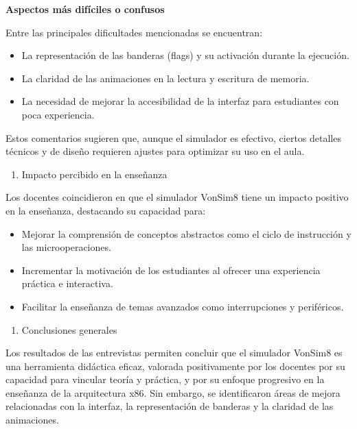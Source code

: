 \documentclass[12pt,oneside]{templates/unerthesis}
\providecommand{\tightlist}{%
  \setlength{\itemsep}{0pt}\setlength{\parskip}{0pt}}
\begin{document}
\textbf{Aspectos más difíciles o confusos}

Entre las principales dificultades mencionadas se encuentran:

\begin{itemize}
\tightlist
\item
  La representación de las banderas (flags) y su activación durante la ejecución.
\item
  La claridad de las animaciones en la lectura y escritura de memoria.
\item
  La necesidad de mejorar la accesibilidad de la interfaz para estudiantes con poca experiencia.
\end{itemize}

Estos comentarios sugieren que, aunque el simulador es efectivo, ciertos detalles técnicos y de diseño requieren ajustes para optimizar su uso en el aula.

\begin{enumerate}
\def\labelenumi{\arabic{enumi}.}
\setcounter{enumi}{4}
\tightlist
\item
  Impacto percibido en la enseñanza
\end{enumerate}

Los docentes coincidieron en que el simulador VonSim8 tiene un impacto positivo en la enseñanza, destacando su capacidad para:

\begin{itemize}
\tightlist
\item
  Mejorar la comprensión de conceptos abstractos como el ciclo de instrucción y las microoperaciones.
\item
  Incrementar la motivación de los estudiantes al ofrecer una experiencia práctica e interactiva.
\item
  Facilitar la enseñanza de temas avanzados como interrupciones y periféricos.
\end{itemize}

\begin{enumerate}
\def\labelenumi{\arabic{enumi}.}
\setcounter{enumi}{5}
\tightlist
\item
  Conclusiones generales
\end{enumerate}

Los resultados de las entrevistas permiten concluir que el simulador VonSim8 es una herramienta didáctica eficaz, valorada positivamente por los docentes por su capacidad para vincular teoría y práctica, y por su enfoque progresivo en la enseñanza de la arquitectura x86. Sin embargo, se identificaron áreas de mejora relacionadas con la interfaz, la representación de banderas y la claridad de las animaciones.
\end{document}
